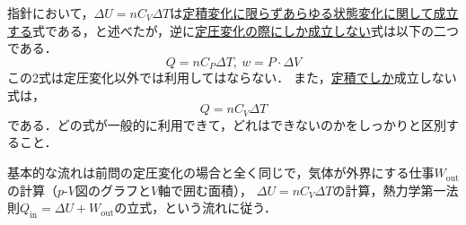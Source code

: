 \begin{multicols}{2}
\begin{bekkai}
\end{bekkai}
\begin{chuu}
指針において，$\Delta U=nC_V\Delta T$は\underline{定積変化}\hskip0pt\underline{に限らず}\hskip0pt\underline{あらゆる}\hskip0pt\underline{状態変化}\hskip0pt\underline{に関して}\hskip0pt\underline{成立する}式である，と述べたが，逆に\underline{定圧変化}\hskip0pt\underline{の際にし}\hskip0pt\underline{か成立し}\hskip0pt\underline{ない}式は以下の二つである．
\[Q=nC_P\Delta T,\ w=P\cdot\Delta V\]
この2式は定圧変化以外では利用してはならない．
また，\underline{定積でし}\hskip0pt\underline{か}成立しない式は，
\[Q=nC_V\Delta T\]
である．どの式が一般的に利用できて，どれはできないのかをしっかりと区別すること．
\end{chuu}

\par\nopagebreak
\begin{sisin}
基本的な流れは前問の定圧変化の場合と全く同じで，気体が外界にする仕事$W_{\mathrm{out}}$の計算（$p$-$V$図のグラフと$V$軸で囲む面積）， $\Delta U=nC_V\Delta T$の計算，熱力学第一法則$Q_{\mathrm{in}}=\Delta U+W_{\mathrm{out}}$の立式，という流れに従う．


\end{sisin}
\end{multicols}
